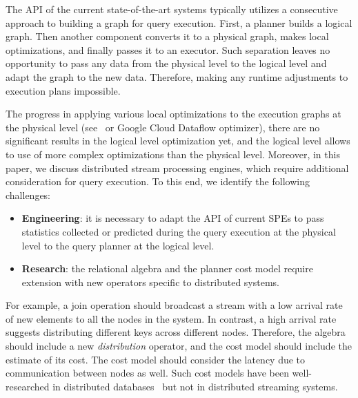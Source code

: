 The API of the current state-of-the-art systems typically utilizes a consecutive approach to building a graph for query execution. First, a planner builds a logical graph. Then another component converts it to a physical graph, makes local optimizations, and finally passes it to an executor.
Such separation leaves no opportunity to pass any data from the physical level to the logical level and adapt the graph to the new data. Therefore, making any runtime adjustments to execution plans impossible. 

The progress in applying various local optimizations to the execution graphs at the physical level (see~\cite{grulich2020grizzly} or Google Cloud Dataflow optimizer), there are no significant results in the logical level optimization yet, and the logical level allows to use of more complex optimizations than the physical level. 
Moreover, in this paper, we discuss distributed stream processing engines, which require additional consideration for query execution. To this end, we identify the following challenges:

\begin{itemize}
    \item \textbf{Engineering}: 
    it is necessary to adapt the API of current SPEs to pass statistics collected or predicted during the query execution at the physical level to the query planner at the logical level.
    
    \item \textbf{Research}: 
    the relational algebra and the planner cost model require extension with new operators specific to distributed systems.
\end{itemize}

For example, a join operation should broadcast a stream with a low arrival rate of new elements to all the nodes in the system. 
In contrast, a high arrival rate suggests distributing different keys across different nodes. 
Therefore, the algebra should include a new \textit{distribution} operator, and the cost model should include the estimate of its cost. The cost model should consider the latency due to communication between nodes as well. Such cost models have been well-researched in distributed databases~\cite{kossmann2000thestate} but not in distributed streaming systems.


